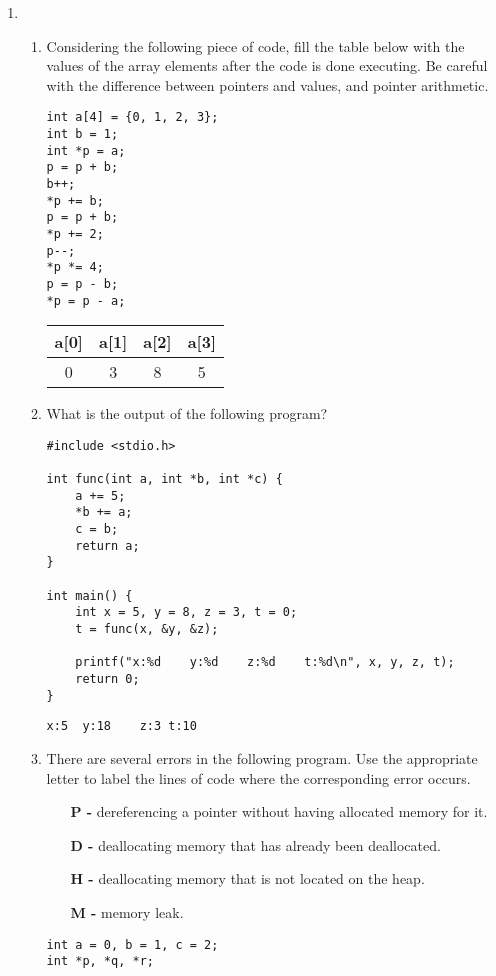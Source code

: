 \documentclass[11pt]{article}
\begin{document}
\begin{enumerate}
	\newpage
	\item \begin{enumerate}
		\item Considering the following piece of code, fill the table below with the values of the array elements after the code is done executing. Be careful with the difference between pointers and values, and pointer arithmetic.
			\begin{Verbatim}
int a[4] = {0, 1, 2, 3};
int b = 1;
int *p = a;
p = p + b;
b++;
*p += b;
p = p + b;
*p += 2;
p--;
*p *= 4;
p = p - b;
*p = p - a;
			\end{Verbatim}
		\begin{tcolorbox}\begin{tabular}[l]{| c | c | c | c |}
			\hline
			a[0] & a[1] & a[2] & a[3]\\
			\hline
			0 & 3 & 8 & 5\\
			\hline
		\end{tabular}\end{tcolorbox}

	\item What is the output of the following program?
	\begin{Verbatim}
#include <stdio.h>

int func(int a, int *b, int *c) {
	a += 5;
	*b += a;
	c = b;
	return a;
}

int main() {
	int x = 5, y = 8, z = 3, t = 0;
	t = func(x, &y, &z);

	printf("x:%d    y:%d    z:%d	t:%d\n", x, y, z, t);
	return 0;
}
	\end{Verbatim}
	\begin{tcolorbox}\Verb|x:5	y:18	z:3	t:10|\end{tcolorbox}

	\newpage
	\item There are several errors in the following program. Use the appropriate letter to label the lines of code where the corresponding error occurs.
		\begin{itemize}
			\item[\textbf{P -}]  dereferencing a pointer without having allocated memory for it.
			\item[\textbf{D -}] deallocating memory that has already been deallocated.
			\item[\textbf{H -}] deallocating memory that is not located on the heap.
			\item[\textbf{M -}] memory leak.
		\end{itemize}
		\begin{Verbatim}
int a = 0, b = 1, c = 2;
int *p, *q, *r;


\end{Verbatim}
\end{enumerate}
\end{enumerate}
\end{document}
